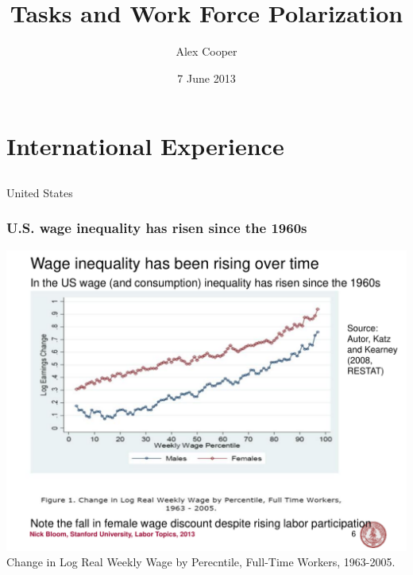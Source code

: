 \documentclass[red]{beamer}
\title[Polarization and Tasks]{Tasks and Work Force Polarization}
\author{Alex Cooper}
\date{7 June 2013}
\begin{document}
%
\begin{frame}
\titlepage
\end{frame}
%
\section{International Experience}
\subsection{}

\begin{frame}[t]{United States}
\frametitle{U.S. wage inequality has risen since the 1960s}
\begin{center}
  \includegraphics[width=\textwidth]{slides/katz_kearney_2008_log_e_chg.pdf}
  \\
  Change in Log Real Weekly Wage by Perecntile, Full-Time Workers, 1963-2005.
  \citep{Autor2008}
\end{center}
\end{frame}
\end{document}
